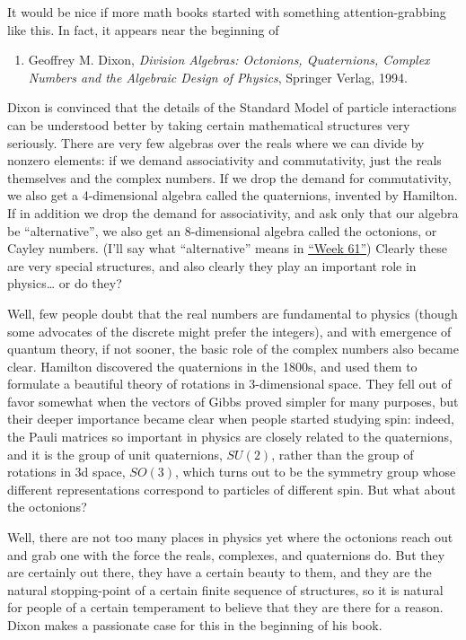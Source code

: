 \documentclass{article}
\def\tightlist{}
\begin{document}
It would be nice if more math books started with something
attention-grabbing like this. In fact, it appears near the beginning of

\begin{enumerate}
\def\labelenumi{\arabic{enumi})}
\tightlist
\item
  Geoffrey M. Dixon, \emph{Division Algebras: Octonions, Quaternions,
  Complex Numbers and the Algebraic Design of Physics}, Springer Verlag,
  1994.
\end{enumerate}

Dixon is convinced that the details of the Standard Model of particle
interactions can be understood better by taking certain mathematical
structures very seriously. There are very few algebras over the reals
where we can divide by nonzero elements: if we demand associativity and
commutativity, just the reals themselves and the complex numbers. If we
drop the demand for commutativity, we also get a 4-dimensional algebra
called the quaternions, invented by Hamilton. If in addition we drop the
demand for associativity, and ask only that our algebra be
``alternative'', we also get an 8-dimensional algebra called the
octonions, or Cayley numbers. (I'll say what ``alternative'' means in
\protect\hyperlink{week61}{``Week 61''}) Clearly these are very special
structures, and also clearly they play an important role in
physics\ldots{} or do they?

Well, few people doubt that the real numbers are fundamental to physics
(though some advocates of the discrete might prefer the integers), and
with emergence of quantum theory, if not sooner, the basic role of the
complex numbers also became clear. Hamilton discovered the quaternions
in the 1800s, and used them to formulate a beautiful theory of rotations
in 3-dimensional space. They fell out of favor somewhat when the vectors
of Gibbs proved simpler for many purposes, but their deeper importance
became clear when people started studying spin: indeed, the Pauli
matrices so important in physics are closely related to the quaternions,
and it is the group of unit quaternions, \(SU(2)\), rather than the
group of rotations in 3d space, \(SO(3)\), which turns out to be the
symmetry group whose different representations correspond to particles
of different spin. But what about the octonions?

Well, there are not too many places in physics yet where the octonions
reach out and grab one with the force the reals, complexes, and
quaternions do. But they are certainly out there, they have a certain
beauty to them, and they are the natural stopping-point of a certain
finite sequence of structures, so it is natural for people of a certain
temperament to believe that they are there for a reason. Dixon makes a
passionate case for this in the beginning of his book.
\end{document}
